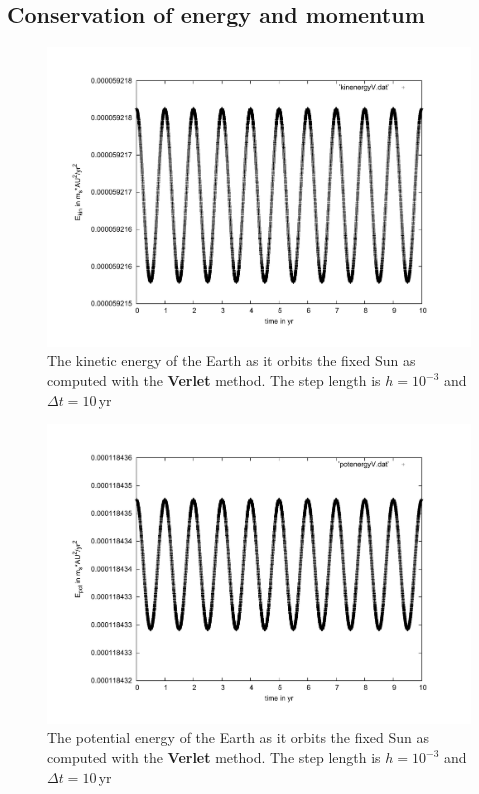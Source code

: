 \documentclass[11pt,a4wide]{article}
\begin{document}
\subsection{Conservation of energy and momentum}

	\begin{figure}
		\centering
			\includegraphics[scale=0.45]{kinenergV.pdf}
		\caption{The kinetic energy of the Earth as it orbits the fixed Sun as computed with the \textbf{Verlet} method. The step length is $h=10^{-3}$ and $\Delta t=10$\,yr}
		\label{fig:ekv}
	\end{figure}
	
	\begin{figure}
		\centering
			\includegraphics[scale=0.45]{potenergV.pdf}
		\caption{The potential energy of the Earth as it orbits the fixed Sun as computed with the \textbf{Verlet} method. The step length is $h=10^{-3}$ and $\Delta t=10$\,yr}
		\label{fig:epv}
	\end{figure}
	
\end{document}
